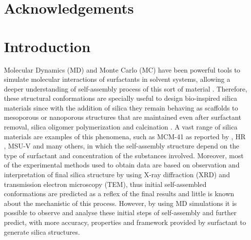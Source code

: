 \documentclass[10pt,a4paper,twoside]{article}
\begin{document}
\vfill
\newpage

\setcounter{tocdepth}{3}
\tableofcontents



\vfill
\newpage

\section{Acknowledgements}

\vfill
\newpage

\section{Introduction}
Molecular Dynamics (MD) and Monte Carlo (MC) have been powerful tools to simulate molecular interactions of surfactants in solvent systems, allowing a deeper understanding of self-assembly process of this sort of material \cite{someone}. Therefore, these structural conformations are specially useful to design bio-inspired silica materials \cite{bioinsp} since with the addition of silica they remain behaving as scaffolds to mesoporous or nanoporous structures that are maintained even after surfactant removal, silica oligomer polymerization and calcination \cite{silica1}.
A vast range of silica materials are examples of this phenomena, such as MCM-41 as reported by , HR \cite{hrib}, MSU-V \cite{msuv} and many others, in which the self-assembly structure depend on the type of surfactant and concentration of the substances involved. Moreover, most of the experimental methods used to obtain data are based on observation and interpretation of final silica structure by using X-ray diffraction (XRD) and transmission electron microscopy (TEM), thus initial self-assembled conformations are predicted as a reflex of the final results and little is known about the mechanistic of this process. However, by using MD simulations it is possible to observe and analyse these initial steps of self-assembly and further predict, with more accuracy, properties and framework provided by surfactant \cite{lipid} to generate silica structures.
\end{document}
